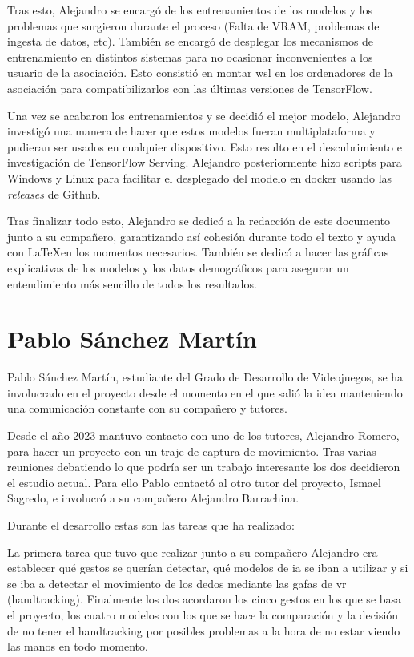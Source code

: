 Tras esto, Alejandro se encargó de los entrenamientos de los modelos y los problemas que surgieron durante el proceso (Falta de VRAM, problemas de ingesta de datos, etc). También se encargó de desplegar los mecanismos de entrenamiento en distintos sistemas para no ocasionar inconvenientes a los usuario de la asociación. Esto consistió en montar \gls{wsl} en los ordenadores de la asociación para compatibilizarlos con las últimas versiones de TensorFlow.

Una vez se acabaron los entrenamientos y se decidió el mejor modelo, Alejandro investigó una manera de hacer que estos modelos fueran multiplataforma y pudieran ser usados en cualquier dispositivo. Esto resulto en el descubrimiento e investigación de TensorFlow Serving. Alejandro posteriormente hizo scripts para Windows y Linux para facilitar el desplegado del modelo en docker usando las \textit{releases} de Github.

Tras finalizar todo esto, Alejandro se dedicó a la redacción de este documento junto a su compañero, garantizando así cohesión durante todo el texto y ayuda con \LaTeX en los momentos necesarios. También se dedicó a hacer las gráficas explicativas de los modelos y los datos demográficos para asegurar un entendimiento más sencillo de todos los resultados.

\section*{Pablo Sánchez Martín}
Pablo Sánchez Martín, estudiante del Grado de Desarrollo de Videojuegos, se ha involucrado en el proyecto desde el momento en el que salió la idea manteniendo una comunicación constante con su compañero y tutores. 

Desde el año 2023 mantuvo contacto con uno de los tutores, Alejandro Romero, para hacer un proyecto con un traje de captura de movimiento.
Tras varias reuniones debatiendo lo que podría ser un trabajo interesante los dos decidieron el estudio actual.
Para ello Pablo contactó al otro tutor del proyecto, Ismael Sagredo, e involucró a su compañero Alejandro Barrachina. 

Durante el desarrollo estas son las tareas que ha realizado:

La primera tarea que tuvo que realizar junto a su compañero Alejandro era establecer qué gestos se querían detectar, qué modelos de \gls{ia} se iban a utilizar y si se iba a detectar el movimiento de los dedos mediante las gafas de \gls{vr} (handtracking).
Finalmente los dos acordaron los cinco gestos en los que se basa el proyecto, los cuatro modelos con los que se hace la comparación y la decisión de no tener el handtracking por posibles problemas a la hora de no estar viendo las manos en todo momento.

